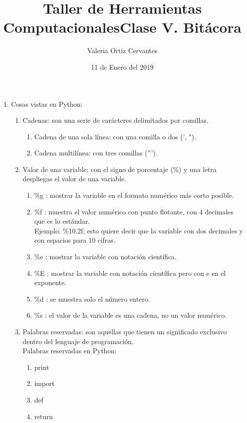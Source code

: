 \documentclass[letterpaper, 12pt, oneside]{article} %
\title{\Huge Taller de Herramientas Computacionales}
\author{Valeria Ortiz Cervantes}
\date{11 de Enero del 2019}
\begin{document}
	\maketitle
	\newpage
	\title{Clase V. Bitácora\\}
	\begin{enumerate}
		\item Cosas vistas en Python:
		\begin{enumerate}
			\item Cadenas: son una serie de carácteres delimitados por comillas.
			\begin{enumerate}
				\item Cadena de una sola línea: con una comilla o dos (', ").
				\item Cadena multilínea: con tres comillas (''').
			\end{enumerate}
			\item Valor de una variable: con el signo de porcentaje ($\%$) y una letra despliegas el valor de una variable. 
			\begin{enumerate}
				\item $\%$g : mostrar la variable en el formato numérico más corto posible.
				\item $\%$f : muestra el valor numérico con punto flotante, con 4 decimales que es lo estándar.\\Ejemplo: $\%$10.2f; esto quiere decir que la variable con dos decimales y con espacios para 10 cifras.
				\item $\%$e : mostrar la variable con notación científica. 
				\item $\%$E : mostrar la variable con notación científica pero con e en el exponente.
				\item $\%$d : se muestra solo el número entero.
				\item $\%$s : el valor de la variable es una cadena, no un valor numérico.
			\end{enumerate}
			\item Palabras reservadas: son aquellas que tienen un significado exclusivo dentro del lenguaje de programación.\\Palabras reservadas en Python:
			\begin{enumerate}
				\item print
				\item import
				\item def
				\item return
			\end{enumerate}

\end{enumerate}
\end{enumerate}
\end{document}
